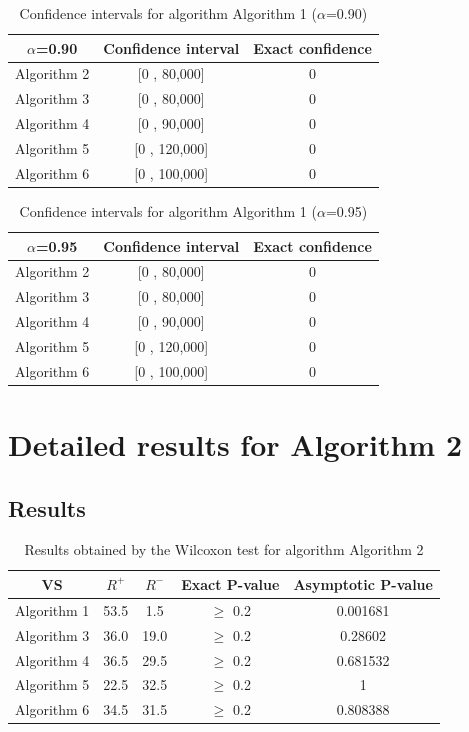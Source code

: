 \documentclass[a4paper,10pt]{article}
\begin{document}
\begin{table}[!htp]
\centering\small
\begin{tabular}{
|c|c|c|}
\hline
 $\alpha$=0.90 & Confidence interval & Exact confidence \\ \hline 
Algorithm 2 & [0 , 80,000] & 0\\ \hline 
Algorithm 3 & [0 , 80,000] & 0\\ \hline 
Algorithm 4 & [0 , 90,000] & 0\\ \hline 
Algorithm 5 & [0 , 120,000] & 0\\ \hline 
Algorithm 6 & [0 , 100,000] & 0\\ \hline 

\end{tabular}
\caption{Confidence intervals for algorithm Algorithm 1 ($\alpha$=0.90)}
\end{table}
\begin{table}[!htp]
\centering\small
\begin{tabular}{
|c|c|c|}
\hline
 $\alpha$=0.95 & Confidence interval & Exact confidence \\ \hline 
Algorithm 2 & [0 , 80,000] & 0\\ \hline 
Algorithm 3 & [0 , 80,000] & 0\\ \hline 
Algorithm 4 & [0 , 90,000] & 0\\ \hline 
Algorithm 5 & [0 , 120,000] & 0\\ \hline 
Algorithm 6 & [0 , 100,000] & 0\\ \hline 

\end{tabular}
\caption{Confidence intervals for algorithm Algorithm 1 ($\alpha$=0.95)}
\end{table}

 \clearpage 


\section{Detailed results for Algorithm 2}


\subsection{Results}

\begin{table}[!htp]
\centering\small
\begin{tabular}{
|c|c|c|c|c|}
\hline
 VS & $R^{+}$ & $R^{-}$ & Exact P-value & Asymptotic P-value \\ \hline 
Algorithm 1 & 53.5 & 1.5 & $\geq$ 0.2 & 0.001681\\ \hline 
Algorithm 3 & 36.0 & 19.0 & $\geq$ 0.2 & 0.28602\\ \hline 
Algorithm 4 & 36.5 & 29.5 & $\geq$ 0.2 & 0.681532\\ \hline 
Algorithm 5 & 22.5 & 32.5 & $\geq$ 0.2 & 1\\ \hline 
Algorithm 6 & 34.5 & 31.5 & $\geq$ 0.2 & 0.808388\\ \hline 

\end{tabular}
\caption{Results obtained by the Wilcoxon test for algorithm Algorithm 2}
\end{table}
\end{document}
